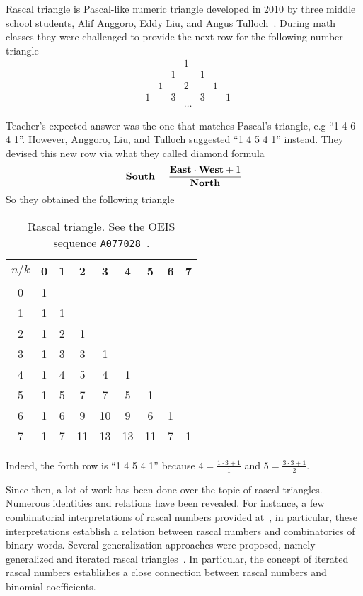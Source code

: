 Rascal triangle is Pascal-like numeric triangle developed in 2010 by three middle school students,
Alif Anggoro, Eddy Liu, and Angus Tulloch~\cite{anggoro2010rascal}.
During math classes they were challenged to provide the next row for the following number triangle
\[
    \begin{array}{cccccccc}
        &   &   &   & 1 &   &   &   \\
        &   &   & 1 &   & 1 &   &   \\
        &   & 1 &   & 2 &   & 1 &   \\
        & 1 &   & 3 &   & 3 &   & 1 \\
        & & & & \dots & &
    \end{array}
\]

Teacher's expected answer was the one that matches Pascal's triangle, e.g ``1 4 6 4 1''.
However, Anggoro, Liu, and Tulloch suggested ``1 4 5 4 1'' instead.
They devised this new row via what they called diamond formula
\begin{align*}
    \mathbf{South}  = \frac{\mathbf{East} \cdot \mathbf{West} + 1}{\mathbf{North}}
\end{align*}
So they obtained the following triangle
\begin{table}[H]
    \begin{center}
        \setlength\extrarowheight{-6pt}
        \begin{tabular}{c|cccccccc}
            $n/k$ & 0 & 1 & 2  & 3  & 4  & 5  & 6 & 7 \\
            \hline
            0     & 1 &   &    &    &    &    &   &   \\
            1     & 1 & 1 &    &    &    &    &   &   \\
            2     & 1 & 2 & 1  &    &    &    &   &   \\
            3     & 1 & 3 & 3  & 1  &    &    &   &   \\
            4     & 1 & 4 & 5  & 4  & 1  &    &   &   \\
            5     & 1 & 5 & 7  & 7  & 5  & 1  &   &   \\
            6     & 1 & 6 & 9  & 10 & 9  & 6  & 1 &   \\
            7     & 1 & 7 & 11 & 13 & 13 & 11 & 7 & 1
        \end{tabular}
    \end{center}
    \caption{Rascal triangle. See the OEIS sequence \href{https://oeis.org/A077028}{\texttt{A077028}}~\cite{sloane2002rascal}.}
    \label{tab:rascal-triangle-i-1}
\end{table}
Indeed, the forth row is ``1 4 5 4 1'' because $4= \frac{1 \cdot 3 + 1}{1}$ and $5 = \frac{3 \cdot 3 + 1}{2}$.

Since then, a lot of work has been done over the topic of rascal triangles.
Numerous identities and relations have been revealed.
For instance, a few combinatorial interpretations of rascal numbers provided at~\cite{gibbs2024two}, in particular,
these interpretations establish a relation between rascal numbers and combinatorics of binary words.
Several generalization approaches were proposed, namely generalized
and iterated rascal triangles~\cite{hotchkiss2019generalized,gregory2023iterated}.
In particular, the concept of iterated rascal numbers establishes a close connection between rascal numbers and binomial
coefficients.
